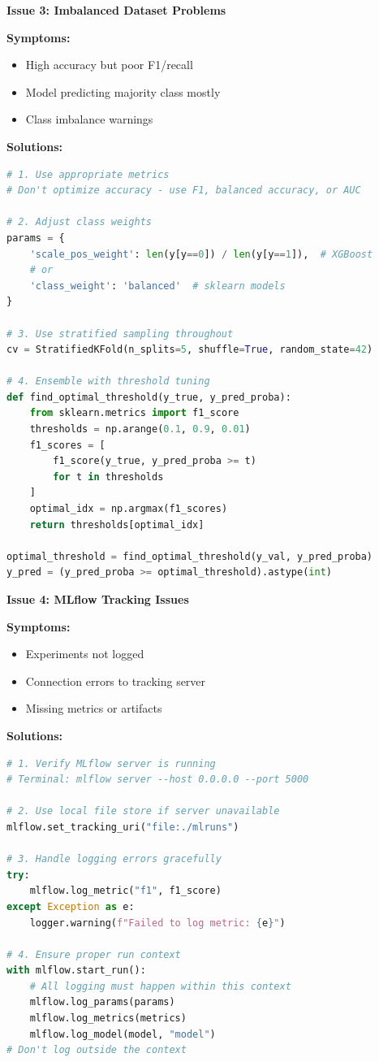 \textbf{Issue 3: Imbalanced Dataset Problems}

\textbf{Symptoms:}
\begin{itemize}
    \item High accuracy but poor F1/recall
    \item Model predicting majority class mostly
    \item Class imbalance warnings
\end{itemize}

\textbf{Solutions:}
\begin{lstlisting}[language=Python]
# 1. Use appropriate metrics
# Don't optimize accuracy - use F1, balanced accuracy, or AUC

# 2. Adjust class weights
params = {
    'scale_pos_weight': len(y[y==0]) / len(y[y==1]),  # XGBoost
    # or
    'class_weight': 'balanced'  # sklearn models
}

# 3. Use stratified sampling throughout
cv = StratifiedKFold(n_splits=5, shuffle=True, random_state=42)

# 4. Ensemble with threshold tuning
def find_optimal_threshold(y_true, y_pred_proba):
    from sklearn.metrics import f1_score
    thresholds = np.arange(0.1, 0.9, 0.01)
    f1_scores = [
        f1_score(y_true, y_pred_proba >= t)
        for t in thresholds
    ]
    optimal_idx = np.argmax(f1_scores)
    return thresholds[optimal_idx]

optimal_threshold = find_optimal_threshold(y_val, y_pred_proba)
y_pred = (y_pred_proba >= optimal_threshold).astype(int)
\end{lstlisting}

\textbf{Issue 4: MLflow Tracking Issues}

\textbf{Symptoms:}
\begin{itemize}
    \item Experiments not logged
    \item Connection errors to tracking server
    \item Missing metrics or artifacts
\end{itemize}

\textbf{Solutions:}
\begin{lstlisting}[language=Python]
# 1. Verify MLflow server is running
# Terminal: mlflow server --host 0.0.0.0 --port 5000

# 2. Use local file store if server unavailable
mlflow.set_tracking_uri("file:./mlruns")

# 3. Handle logging errors gracefully
try:
    mlflow.log_metric("f1", f1_score)
except Exception as e:
    logger.warning(f"Failed to log metric: {e}")

# 4. Ensure proper run context
with mlflow.start_run():
    # All logging must happen within this context
    mlflow.log_params(params)
    mlflow.log_metrics(metrics)
    mlflow.log_model(model, "model")
# Don't log outside the context
\end{lstlisting}

